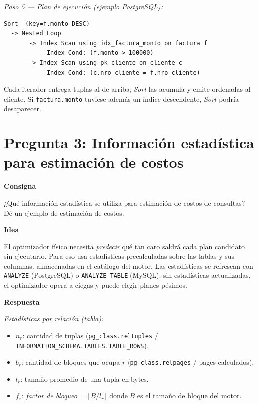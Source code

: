 \documentclass[11pt,a4paper]{article}
\newcommand{\itemcabecera}[1]{\noindent\textbf{#1}\par\medskip}
\newcommand{\bloqueConsigna}{\itemcabecera{Consigna}}
\newcommand{\bloqueIdea}{\itemcabecera{Idea}}
\newcommand{\bloqueRespuesta}{\itemcabecera{Respuesta}}
\begin{document}
\textit{Paso 5 --- Plan de ejecución (ejemplo PostgreSQL):}

\begin{lstlisting}[style=plain]
Sort  (key=f.monto DESC)
  -> Nested Loop
       -> Index Scan using idx_factura_monto on factura f
            Index Cond: (f.monto > 100000)
       -> Index Scan using pk_cliente on cliente c
            Index Cond: (c.nro_cliente = f.nro_cliente)
\end{lstlisting}

Cada iterador entrega tuplas al de arriba; \emph{Sort} las acumula y emite ordenadas al cliente. Si \texttt{factura.monto} tuviese además un índice descendente, \emph{Sort} podría desaparecer.

\section{Pregunta 3: Información estadística para estimación de costos}

\bloqueConsigna

¿Qué información estadística se utiliza para estimación de costos de consultas? Dé un ejemplo de estimación de costos.

\bloqueIdea

El optimizador físico necesita \emph{predecir} qué tan caro saldrá cada plan candidato sin ejecutarlo. Para eso usa estadísticas precalculadas sobre las tablas y sus columnas, almacenadas en el catálogo del motor. Las estadísticas se refrescan con \texttt{ANALYZE} (PostgreSQL) o \texttt{ANALYZE TABLE} (MySQL); sin estadísticas actualizadas, el optimizador opera a ciegas y puede elegir planes pésimos.

\bloqueRespuesta

\textit{Estadísticas por relación (tabla):}

\begin{itemize}
    \item $n_r$: cantidad de tuplas (\texttt{pg\_class.reltuples} / \texttt{INFORMATION\_SCHEMA.TABLES.TABLE\_ROWS}).
    \item $b_r$: cantidad de bloques que ocupa $r$ (\texttt{pg\_class.relpages} / pages calculados).
    \item $l_r$: tamaño promedio de una tupla en bytes.
    \item $f_r$: \emph{factor de bloqueo} = $\lfloor B / l_r \rfloor$ donde $B$ es el tamaño de bloque del motor.
\end{itemize}
\end{document}
